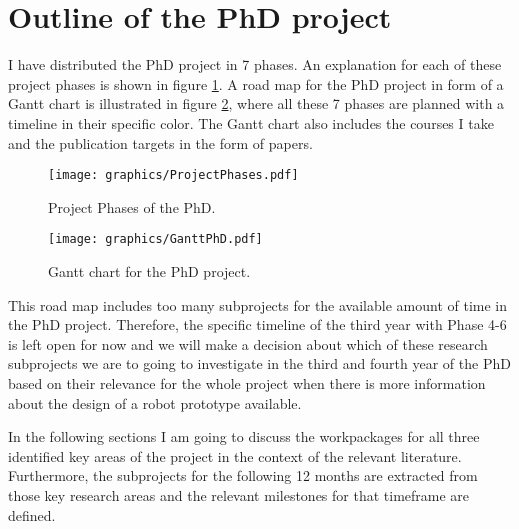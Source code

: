 \section{Outline of the PhD project} \label{sec:outline}
%
I have distributed the PhD project in 7 phases. An explanation for each of these project phases is shown in figure \ref{ProjectPhases}. A road map for the PhD project in form of a Gantt
chart is illustrated in figure \ref{GanttPhD}, where all these 7 phases are planned with a timeline in their specific color. The Gantt chart also includes the courses I take
 and the publication targets in the form of papers. 
%
\begin{figure}[ht]
    \centering
    \texttt{[image: graphics/ProjectPhases.pdf]}
    \caption{Project Phases of the PhD.}
    \label{ProjectPhases}
   \end{figure}
%
\begin{figure}[ht]
    \centering
    \texttt{[image: graphics/GanttPhD.pdf]}
    \caption{Gantt chart for the PhD project.}
    \label{GanttPhD}
   \end{figure}   
%
This road map includes too many subprojects for the available amount of time in the PhD project. Therefore, the specific timeline of the third year with Phase 4-6 is left open for now and we will make 
a decision about which of these research subprojects we are to going to investigate in the third and fourth year of the PhD based on their relevance for the whole project when there is more 
information about the design of a robot prototype available.
\par
%
In the following sections I am going to discuss the workpackages for all three identified key areas of the project in the context of the relevant literature. Furthermore, the
subprojects for the following 12 months are extracted from those key research areas and the relevant milestones for that timeframe are defined. 
%
%
